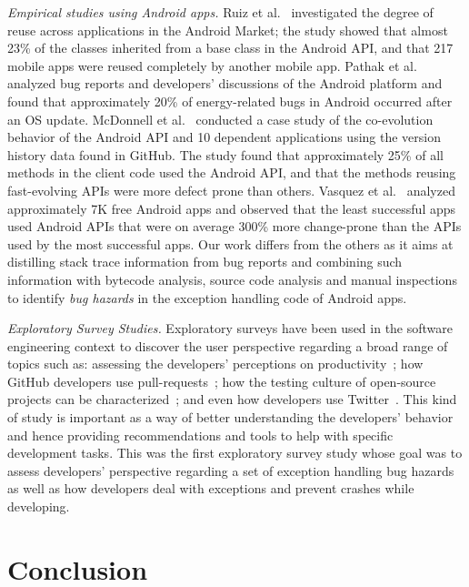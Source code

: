 \textit{Empirical studies using Android apps.} Ruiz et al.~\cite{Ruiz12}
investigated the degree of reuse across applications in the Android Market; the
study showed that almost 23\% of the classes inherited from a base class in the
Android API, and that 217 mobile apps were reused completely by another mobile
app. Pathak et al.~\cite{Patha11} analyzed bug reports and developers'
discussions of the Android platform and found that approximately 20\% of
energy-related bugs in Android occurred after an OS update. McDonnell et
al.~\cite{McDon13} conducted a case study of the co-evolution behavior of
the Android API and 10 dependent applications using the version history data found
in GitHub. The study found that approximately 25\% of all methods in the client
code used the Android API, and that the methods reusing fast-evolving APIs were
more defect prone than others. Vasquez et al.~\cite{Linar13} analyzed
approximately 7K free Android apps and observed that the least successful apps
used Android APIs that were on average 300\% more change-prone than the APIs
used by the most successful apps. Our work differs from the others as it aims at
distilling stack trace information from bug reports and combining such information
with bytecode analysis, source code analysis and manual inspections
to identify \emph{bug hazards} in the exception handling code of Android apps.


\textit{Exploratory Survey Studies.} Exploratory surveys have been used in the software
engineering context to discover the user perspective regarding a broad range of 
topics such as: assessing the developers' perceptions on productivity~\cite{meyer2014}; 
how GitHub developers use pull-requests~\cite{gousios2015}; 
how the testing culture of open-source projects can be characterized~\cite{pham2013}; 
and even how developers use Twitter~\cite{singer2014}. This kind of study is important as a way of 
better understanding the developers' behavior and hence providing recommendations and 
tools to help with specific development tasks. This was the first exploratory survey study whose
goal was to assess developers' perspective regarding a set of exception handling bug hazards
as well as how developers deal with exceptions and prevent crashes while developing.
 




\section{Conclusion}
\label{sec:conc}

